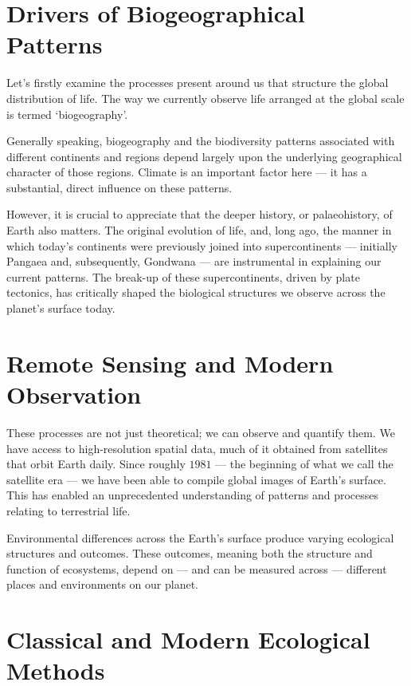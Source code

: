 \documentclass[
  10pt,
]{book}
\begin{document}
\section{Drivers of Biogeographical
Patterns}\label{drivers-of-biogeographical-patterns}

Let's firstly examine the processes present around us that structure the
global distribution of life. The way we currently observe life arranged
at the global scale is termed `biogeography'.

Generally speaking, biogeography and the biodiversity patterns
associated with different continents and regions depend largely upon the
underlying geographical character of those regions. Climate is an
important factor here --- it has a substantial, direct influence on
these patterns.

However, it is crucial to appreciate that the deeper history, or
palaeohistory, of Earth also matters. The original evolution of life,
and, long ago, the manner in which today's continents were previously
joined into supercontinents --- initially Pangaea and, subsequently,
Gondwana --- are instrumental in explaining our current patterns. The
break-up of these supercontinents, driven by plate tectonics, has
critically shaped the biological structures we observe across the
planet's surface today.

\section{Remote Sensing and Modern
Observation}\label{remote-sensing-and-modern-observation}

These processes are not just theoretical; we can observe and quantify
them. We have access to high-resolution spatial data, much of it
obtained from satellites that orbit Earth daily. Since roughly \(1981\)
--- the beginning of what we call the satellite era --- we have been
able to compile global images of Earth's surface. This has enabled an
unprecedented understanding of patterns and processes relating to
terrestrial life.

Environmental differences across the Earth's surface produce varying
ecological structures and outcomes. These outcomes, meaning both the
structure and function of ecosystems, depend on --- and can be measured
across --- different places and environments on our planet.

\section{Classical and Modern Ecological
Methods}\label{classical-and-modern-ecological-methods}
\end{document}
